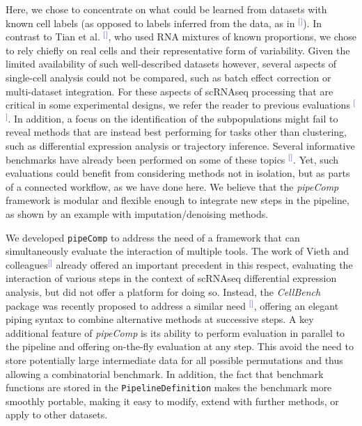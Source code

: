 \documentclass[11pt]{article}
\renewcommand{\cite}[1]{\textcolor{Blue}{$^[$\supercite{#1}$^]$}}
\begin{document}
Here, we chose to concentrate on what could be learned from datasets with known cell labels (as opposed to labels inferred from the data, as in \cite{MereuCellAtlas2019}). In contrast to Tian et al. \cite{tianMixology2018}, who used RNA mixtures of known proportions, we chose to rely chiefly on real cells and their representative form of variability. Given the limited availability of such well-described datasets however, several aspects of single-cell analysis could not be compared, such as batch effect correction or multi-dataset integration. For these aspects of scRNAseq processing that are critical in some experimental designs, we refer the reader to previous evaluations \cite{TranBatch2020, StuartIntegration2019}. In addition, a focus on the identification of the subpopulations might fail to reveal methods that are instead best performing for tasks other than clustering, such as differential expression analysis or trajectory inference. Several informative benchmarks have already been performed on some of these topics \cite{CrowellMuscat2019, DalMolinDE2017, JaakkolaDE2017, SaelensTraject2019, SonesonDE2018, WangDE2019}. Yet, such evaluations could benefit from considering methods not in isolation, but as parts of a connected workflow, as we have done here. We believe that the \textit{pipeComp} framework is modular and flexible enough to integrate new steps in the pipeline, as shown by an example with imputation/denoising methods.

We developed \texttt{pipeComp} to address the need of a framework that can simultaneously evaluate the interaction of multiple tools. The work of Vieth and colleagues\cite{viethSystematic2019} already offered an important precedent in this respect, evaluating the interaction of various steps in the context of scRNAseq differential expression analysis, but did not offer a platform for doing so. Instead, the \textit{CellBench} package was recently proposed to address a similar need \cite{suCellbench}, offering an elegant piping syntax to combine alternative methods at successive steps. A key additional feature of \textit{pipeComp} is its ability to perform evaluation in parallel to the pipeline and offering on-the-fly evaluation at any step. This avoid the need to store potentially large intermediate data for all possible permutations and thus allowing a combinatorial benchmark. In addition, the fact that benchmark functions are stored in the \texttt{PipelineDefinition} makes the benchmark more smoothly portable, making it easy to modify, extend with further methods, or apply to other datasets.
\end{document}
